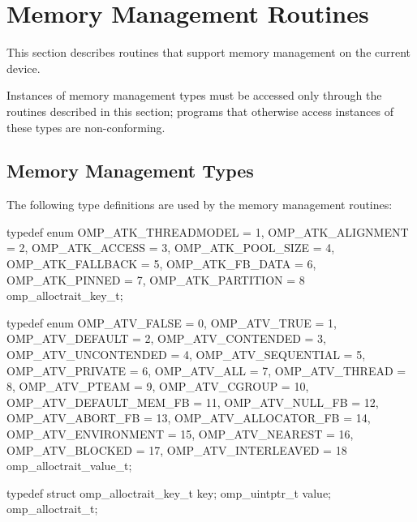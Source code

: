 
\section{Memory Management Routines}
\label{sec:Memory Management Routines}
This section describes routines that support memory management on the current device.

Instances of memory management types must be accessed only through the routines described in this section; programs that otherwise access instances of these types are non-conforming.

\subsection{Memory Management Types}
\label{subsec:Memory Management Types}

The following type definitions are used by the memory management routines:

\begin{ccppspecific}
\begin{ompEnv}
typedef enum {
  OMP_ATK_THREADMODEL = 1,
  OMP_ATK_ALIGNMENT = 2,
  OMP_ATK_ACCESS = 3,
  OMP_ATK_POOL_SIZE = 4,
  OMP_ATK_FALLBACK = 5,
  OMP_ATK_FB_DATA = 6,
  OMP_ATK_PINNED = 7,
  OMP_ATK_PARTITION = 8
} omp_alloctrait_key_t;

typedef enum {
  OMP_ATV_FALSE = 0,   
  OMP_ATV_TRUE = 1,    
  OMP_ATV_DEFAULT = 2,
  OMP_ATV_CONTENDED = 3,
  OMP_ATV_UNCONTENDED = 4,
  OMP_ATV_SEQUENTIAL = 5,
  OMP_ATV_PRIVATE = 6,
  OMP_ATV_ALL = 7,
  OMP_ATV_THREAD = 8,
  OMP_ATV_PTEAM = 9,
  OMP_ATV_CGROUP = 10,
  OMP_ATV_DEFAULT_MEM_FB = 11,
  OMP_ATV_NULL_FB = 12,
  OMP_ATV_ABORT_FB = 13,
  OMP_ATV_ALLOCATOR_FB = 14,
  OMP_ATV_ENVIRONMENT = 15,
  OMP_ATV_NEAREST = 16,
  OMP_ATV_BLOCKED = 17,
  OMP_ATV_INTERLEAVED = 18
} omp_alloctrait_value_t;

typedef struct {
  omp_alloctrait_key_t key;
  omp_uintptr_t value;
} omp_alloctrait_t;

\end{ompEnv}
\end{ccppspecific}

